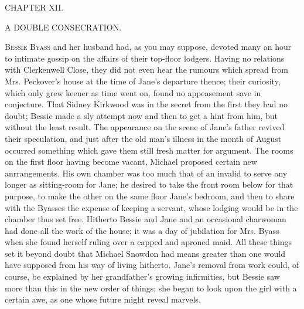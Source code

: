 {}

{CHAPTER XII.}

A DOUBLE CONSECRATION.

\textsc{Bessie Byass} and her husband had, as you may suppose, devoted
many an hour to intimate gossip on the affairs of their top-floor
lodgers. Having no relations with Clerkenwell Close, they did not even
hear the rumours which spread from Mrs. Peckover's house at the time of
Jane's departure thence; their curiosity, which only grew keener as time
went on, found no appeasement save in conjecture. That Sidney Kirkwood
was in the secret from the first they had no doubt; Bessie made a sly
attempt now and then to get a hint from him, but without the least
result. The appearance on the scene of Jane's father revived their
speculation, and just after the old man's illness in the month of August
occurred something which gave them still fresh matter for {}argument.
The rooms on the first floor having become vacant, Michael proposed
certain new anrrangements. His own chamber was too much that of an
invalid to serve any longer as sitting-room for Jane; he desired to take
the front room below for that purpose, to make the other on the same
floor Jane's bedroom, and then to share with the Byasses the expense of
keeping a servant, whose lodging would be in the chamber thus set free.
Hitherto Bessie and Jane and an occasional charwoman had done all the
work of the house; it was a day of jubilation for Mrs. Byass when she
found herself ruling over a capped and aproned maid. All these things
set it beyond doubt that Michael Snowdon had means greater than one
would have supposed from his way of living hitherto. Jane's removal from
work could, of course, be explained by her grandfather's growing
infirmities, but Bessie saw more than this in the new order of things;
she began to look upon the girl with a certain awe, as one whose future
might reveal marvels.

